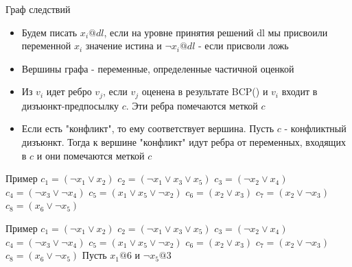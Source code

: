 \documentclass{beamer}
\begin{document}
\begin{frame}{Граф следствий}
\begin{itemize}
\item Будем писать $x_i@dl$, если на уровне принятия решений dl мы присвоили переменной $x_i$ значение истина и $\lnot x_i@dl$ -
если присволи ложь
\item Вершины графа - переменные, определенные частичной оценкой
\item Из $v_i$ идет ребро $v_j$, если $v_j$ оценена в результате BCP() и $v_i$ входит в дизъюнкт-предпосылку $c$. Эти ребра
помечаются меткой $c$
\item Если есть "конфликт", то ему соответствует вершина. Пусть $c$ - конфликтный дизъюнкт. Тогда к вершине "конфликт" идут
ребра от переменных, входящих в $c$ и они помечаются меткой $c$
\end{itemize}
\end{frame}

\begin{frame}{Пример}
$c_1 = (\lnot x_1 \vee x_2 )$\newline
$c_2 = (\lnot x_1 \vee x_3 \vee x_5 )$\newline
$c_3 = (\lnot x_2 \vee x_4 )$\newline
$c_4 = (\lnot x_3 \vee \lnot x_4 )$\newline
$c_5 = (x_1 \vee x_5 \vee \lnot x_2 )$\newline
$c_6 = (x_2 \vee x_3 )$\newline
$c_7 = (x_2 \vee \lnot x_3 )$\newline
$c_8 = (x_6 \vee \lnot x_5 )$\newline
\end{frame}

\begin{frame}{Пример}
$c_1 = (\lnot x_1 \vee x_2 )$\newline
$c_2 = (\lnot x_1 \vee x_3 \vee x_5 )$\newline
$c_3 = (\lnot x_2 \vee x_4 )$\newline
$c_4 = (\lnot x_3 \vee \lnot x_4 )$\newline
$c_5 = (x_1 \vee x_5 \vee \lnot x_2 )$\newline
$c_6 = (x_2 \vee x_3 )$\newline
$c_7 = (x_2 \vee \lnot x_3 )$\newline
$c_8 = (x_6 \vee \lnot x_5 )$\newline
Пусть $x_1@6$ и $\lnot x_5@3$
\end{frame}
\end{document}

